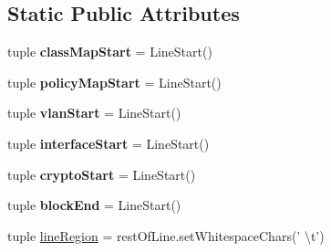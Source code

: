 \subsection*{Static Public Attributes}
\begin{DoxyCompactItemize}
\item 
\hypertarget{classxutools_1_1parsers_1_1_cisco_i_o_s_parser_a46030d7d96a961a3730bf3d88348ccaa}{tuple {\bfseries class\-Map\-Start} = Line\-Start()}\label{classxutools_1_1parsers_1_1_cisco_i_o_s_parser_a46030d7d96a961a3730bf3d88348ccaa}

\item 
\hypertarget{classxutools_1_1parsers_1_1_cisco_i_o_s_parser_ac216bca49789fa8b75313142bdafe0d7}{tuple {\bfseries policy\-Map\-Start} = Line\-Start()}\label{classxutools_1_1parsers_1_1_cisco_i_o_s_parser_ac216bca49789fa8b75313142bdafe0d7}

\item 
\hypertarget{classxutools_1_1parsers_1_1_cisco_i_o_s_parser_a7ddfb4dfeb5bacbbdb9553aeb8a39592}{tuple {\bfseries vlan\-Start} = Line\-Start()}\label{classxutools_1_1parsers_1_1_cisco_i_o_s_parser_a7ddfb4dfeb5bacbbdb9553aeb8a39592}

\item 
\hypertarget{classxutools_1_1parsers_1_1_cisco_i_o_s_parser_aedf90f4b44fcf25e67527cd02fadb8c0}{tuple {\bfseries interface\-Start} = Line\-Start()}\label{classxutools_1_1parsers_1_1_cisco_i_o_s_parser_aedf90f4b44fcf25e67527cd02fadb8c0}

\item 
\hypertarget{classxutools_1_1parsers_1_1_cisco_i_o_s_parser_afa43f1d39c987069b6832068ce34955c}{tuple {\bfseries crypto\-Start} = Line\-Start()}\label{classxutools_1_1parsers_1_1_cisco_i_o_s_parser_afa43f1d39c987069b6832068ce34955c}

\item 
\hypertarget{classxutools_1_1parsers_1_1_cisco_i_o_s_parser_ae73071f6d66f25b4e5e412560972f995}{tuple {\bfseries block\-End} = Line\-Start()}\label{classxutools_1_1parsers_1_1_cisco_i_o_s_parser_ae73071f6d66f25b4e5e412560972f995}

\item 
\hypertarget{classxutools_1_1parsers_1_1_cisco_i_o_s_parser_af897795f11b6d6999ae379bb011c8b29}{tuple \hyperlink{classxutools_1_1parsers_1_1_cisco_i_o_s_parser_af897795f11b6d6999ae379bb011c8b29}{line\-Region} = rest\-Of\-Line.\-set\-Whitespace\-Chars(' \textbackslash{}t')}\label{classxutools_1_1parsers_1_1_cisco_i_o_s_parser_af897795f11b6d6999ae379bb011c8b29}


\end{DoxyCompactItemize}

